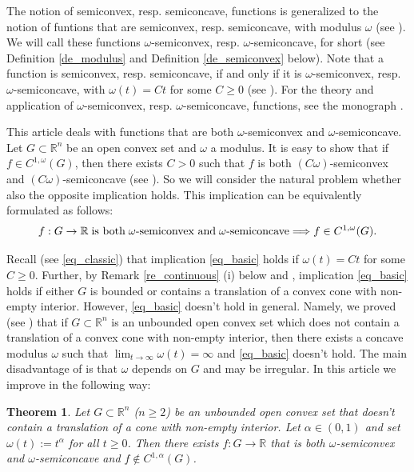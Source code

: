\documentclass[10pt,a4paper]{amsart}
\newtheorem{theorem}{Theorem}[section]
\theoremstyle{definition}
\newcommand{\R}{\mathbb{R}}
\begin{document}
The notion of semiconvex, resp. semiconcave, functions is generalized to the notion of funtions that are semiconvex, resp. semiconcave, with modulus $ \omega $ (see \cite[Definition 2.1.1]{CS}). We will call these functions $ \omega $-semiconvex, resp. $ \omega $-semiconcave, for short (see Definition \ref{de_modulus} and Definition \ref{de_semiconvex} below). Note that a function is semiconvex, resp. semiconcave, if and only if it is $ \omega $-semiconvex, resp. $ \omega $-semiconcave, with $ \omega(t)=Ct $ for some $ C\geq 0 $ (see \cite[Proposition 1.1.3]{CS}). For the theory and application of $ \omega $-semiconvex, resp. $ \omega $-semiconcave, functions, see the monograph \cite{CS}.

This article deals with functions that are both $ \omega $-semiconvex and $ \omega $-semiconcave. Let $ G\subset\R^n $ be an open convex set and $ \omega $ a modulus. It is easy to show that if $ f\in C^{1,\omega}(G) $, then there exists $ C>0 $ such that $ f $ is both $ (C\omega) $-semiconvex and $ (C\omega) $-semiconcave (see \cite[Proposition 2.1.2]{CS}). So we will consider the natural problem whether also the opposite implication holds. This implication can be equivalently formulated as follows:
\begin{align}\label{eq_basic}
f:G\to\R\;\textnormal{is both}\;\omega\textnormal{-semiconvex and}\;\omega\textnormal{-semiconcave}\Longrightarrow f\in C^{1,\omega}(G).
\end{align}

Recall (see \eqref{eq_classic}) that implication \eqref{eq_basic} holds if $ \omega(t)=Ct $ for some $ C\geq 0 $. Further, by Remark \ref{re_continuous} (i) below and \cite[p. 839]{KZ}, implication \eqref{eq_basic} holds if either $ G $ is bounded or contains a translation of a convex cone with non-empty interior. However, \eqref{eq_basic} doesn't hold in general. Namely, we proved (see \cite[Theorem 1.9]{KZ}) that if $ G\subset\R^n $ is an unbounded open convex set which does not contain a translation of a convex cone with non-empty interior, then there exists a concave modulus $ \omega $ such that $ \lim_{t\to\infty}\omega(t)=\infty $ and \eqref{eq_basic} doesn't hold. The main disadvantage of \cite[Theorem 1.9]{KZ} is that $ \omega $ depends on $ G $ and may be irregular. In this article we improve \cite[Theorem 1.9]{KZ} in the following way:

\begin{theorem}\label{th_1}
Let $ G\subset\R^n $ ($ n\geq 2 $) be an unbounded open convex set that doesn't contain a translation of a cone with non-empty interior. Let $ \alpha\in (0,1) $ and set $ \omega(t):=t^\alpha $ for all $ t\geq 0 $. Then there exists $ f:G\to\R $ that is both $ \omega $-semiconvex and $ \omega $-semiconcave and $ f\notin C^{1,\alpha}(G) $.
\end{theorem}
\end{document}
